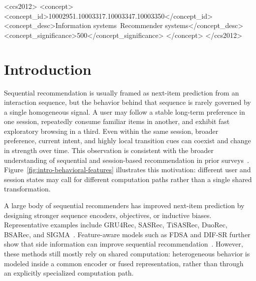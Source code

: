 \documentclass[sigconf,anonymous,review]{acmart}
\begin{document}
\begin{CCSXML}
<ccs2012>
 <concept>
  <concept_id>10002951.10003317.10003347.10003350</concept_id>
  <concept_desc>Information systems~Recommender systems</concept_desc>
  <concept_significance>500</concept_significance>
 </concept>
</ccs2012>
\end{CCSXML}



\maketitle


\section{Introduction}
Sequential recommendation is usually framed as next-item prediction from an interaction sequence, but the behavior behind that sequence is rarely governed by a single homogeneous signal. A user may follow a stable long-term preference in one session, repeatedly consume familiar items in another, and exhibit fast exploratory browsing in a third. Even within the same session, broader preference, current intent, and highly local transition cues can coexist and change in strength over time. This observation is consistent with the broader understanding of sequential and session-based recommendation in prior surveys~\cite{wang2019seqsurvey,wang2021sessionsurvey}. Figure~\ref{fig:intro-behavioral-features} illustrates this motivation: different user and session states may call for different computation paths rather than a single shared transformation.

A large body of sequential recommenders has improved next-item prediction by designing stronger sequence encoders, objectives, or inductive biases. Representative examples include GRU4Rec, SASRec, TiSASRec, DuoRec, BSARec, and SIGMA~\cite{hidasi2016gru4rec,kang2018sasrec,li2020tisasrec,qiu2022duorec,shin2024bsarec,liu2025sigma}. Feature-aware models such as FDSA and DIF-SR further show that side information can improve sequential recommendation~\cite{zhang2019fdsa,xie2022difsr}. However, these methods still mostly rely on shared computation: heterogeneous behavior is modeled inside a common encoder or fused representation, rather than through an explicitly specialized computation path.
\end{document}
